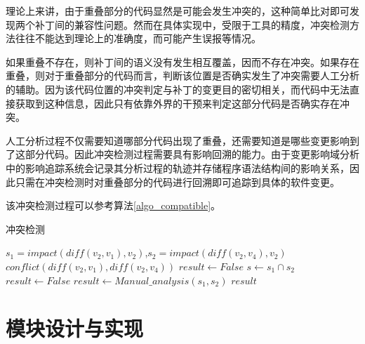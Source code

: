 %

理论上来讲，由于重叠部分的代码显然是可能会发生冲突的，这种简单比对即可发现两个补丁间的兼容性问题。然而在具体实现中，受限于工具的精度，冲突检测方法往往不能达到理论上的准确度，而可能产生误报等情况。

如果重叠不存在，则补丁间的语义没有发生相互覆盖，因而不存在冲突。如果存在重叠，则对于重叠部分的代码而言，判断该位置是否确实发生了冲突需要人工分析的辅助。因为该代码位置的冲突判定与补丁的变更目的密切相关，而代码中无法直接获取到这种信息，因此只有依靠外界的干预来判定这部分代码是否确实存在冲突。

人工分析过程不仅需要知道哪部分代码出现了重叠，还需要知道是哪些变更影响到了这部分代码。因此冲突检测过程需要具有影响回溯的能力。由于变更影响域分析中的影响追踪系统会记录其分析过程的轨迹并存储程序语法结构间的影响关系，因此只需在冲突检测时对重叠部分的代码进行回溯即可追踪到具体的软件变更。


该冲突检测过程可以参考算法\ref {algo_compatible}。

\begin{algorithm}[H]
	\caption{冲突检测}
	\label{algo_compatible}
	\begin{algorithmic}[1]
		\Require $s_1=impact(diff(v_2,v_1),v_2)$,$s_2=impact(diff(v_2,v_4),v_2)$
		\Ensure $conflict(diff(v_2,v_1),diff(v_2,v_4))$
		\State $result \gets False$
		\Else
		\State $s \gets s_1 \cap s_2$
		\State $result \gets False$
		\Else				
		\State $result \gets Manual\_analysis(s_1, s_2)$
		\EndIf 
		\EndIf
		\Return $result$
	\end{algorithmic}
\end{algorithm}


\section{模块设计与实现}
\label {chap_mod}


